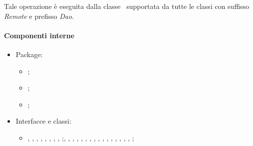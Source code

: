 \documentclass[../Funzionalita.tex]{subfiles}
\begin{document}
			Tale operazione è eseguita dalla classe \DatabaseService\ supportata da tutte le classi con suffisso \textit{Remote} e prefisso \textit{Dao}.

			\paragraph*{Componenti interne}
			\begin{itemize}
			
				\item Package:
				\begin{itemize}
					\item[] \dataaccess;
					\item[] \service;
					\item[] \dao;
				\end{itemize}
				
				\item Interfacce e classi:
				\begin{itemize}
					\item[] \DatabaseService, \BuildingService, \EdgeService, \PhotoService, \PointOfInterestService, \RegionOfInterestService, \ServiceHelper, \CursorConverter, \SQLiteDaoFactory;\SQLDao, \BuildingDao, \CategoryDao, \EdgeDao, \EdgeTypeDao, \PhotoDao, \PointOfInterestDao, \RegionOfInterestDao, \RoiPoiDao, \RemoteBuildingDao, \RemoteCategoryDao, \RemoteEdgeDao, \RemoteEdgeTypeDao,  \RemotePhotoDao,  \RemotePointOfInterestDao, \RemoteRegionOfInterestDao, \RemoteRoiPoiDao;
				\end{itemize}
				
			\end{itemize}
\end{document}
